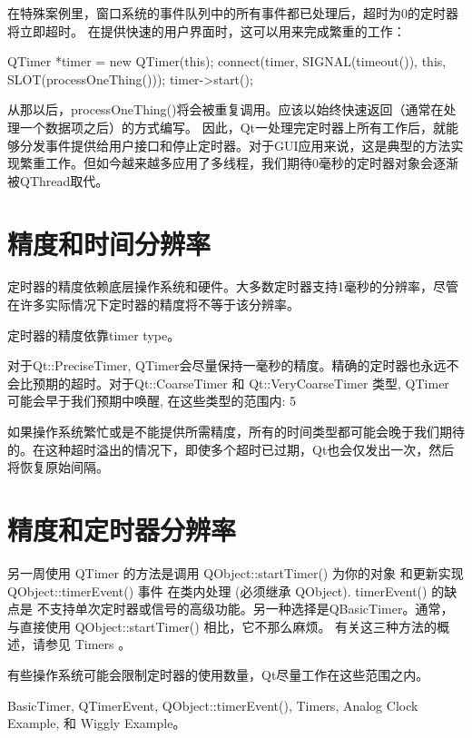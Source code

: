 在特殊案例里，窗口系统的事件队列中的所有事件都已处理后，超时为0的定时器将立即超时。 在提供快速的用户界面时，这可以用来完成繁重的工作：

\begin{cppcode}
 QTimer *timer = new QTimer(this);
 connect(timer, SIGNAL(timeout()), this, SLOT(processOneThing()));
 timer->start();
\end{cppcode}

从那以后，processOneThing()将会被重复调用。应该以始终快速返回（通常在处理一个数据项之后）的方式编写。 因此，Qt一处理完定时器上所有工作后，就能够分发事件提供给用户接口和停止定时器。对于GUI应用来说，这是典型的方法实现繁重工作。但如今越来越多应用了多线程，我们期待0毫秒的定时器对象会逐渐被QThread取代。

\section{精度和时间分辨率}

定时器的精度依赖底层操作系统和硬件。大多数定时器支持1毫秒的分辨率，尽管在许多实际情况下定时器的精度将不等于该分辨率。

定时器的精度依靠timer type。

对于Qt::PreciseTimer, QTimer会尽量保持一毫秒的精度。精确的定时器也永远不会比预期的超时。对于Qt::CoarseTimer 和 Qt::VeryCoarseTimer 类型, QTimer 可能会早于我们预期中唤醒, 在这些类型的范围内: 5%

如果操作系统繁忙或是不能提供所需精度，所有的时间类型都可能会晚于我们期待的。在这种超时溢出的情况下，即使多个超时已过期，Qt也会仅发出一次，然后将恢复原始间隔。

\section{精度和定时器分辨率}

另一周使用 QTimer 的方法是调用 QObject::startTimer() 为你的对象 和更新实现QObject::timerEvent() 事件 在类内处理 (必须继承 QObject). timerEvent() 的缺点是 不支持单次定时器或信号的高级功能。另一种选择是QBasicTimer。通常，与直接使用 QObject::startTimer() 相比，它不那么麻烦。 有关这三种方法的概述，请参见 Timers 。

有些操作系统可能会限制定时器的使用数量，Qt尽量工作在这些范围之内。

\begin{seeAlso}
BasicTimer, QTimerEvent, QObject::timerEvent(), Timers, Analog Clock Example, 和 Wiggly Example。
\end{seeAlso}

